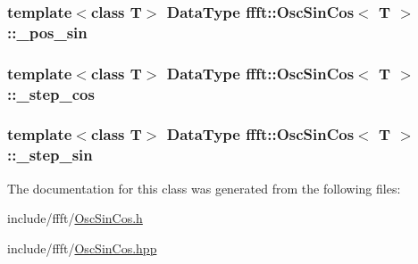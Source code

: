 \subsubsection[{\texorpdfstring{\+\_\+pos\+\_\+sin}{_pos_sin}}]{\setlength{\rightskip}{0pt plus 5cm}template$<$class T$>$ {\bf Data\+Type} {\bf ffft\+::\+Osc\+Sin\+Cos}$<$ T $>$\+::\+\_\+pos\+\_\+sin\hspace{0.3cm}{\ttfamily [private]}}\hypertarget{classffft_1_1OscSinCos_afddb969706b1b473229bf433d308b670}{}\label{classffft_1_1OscSinCos_afddb969706b1b473229bf433d308b670}
\subsubsection[{\texorpdfstring{\+\_\+step\+\_\+cos}{_step_cos}}]{\setlength{\rightskip}{0pt plus 5cm}template$<$class T$>$ {\bf Data\+Type} {\bf ffft\+::\+Osc\+Sin\+Cos}$<$ T $>$\+::\+\_\+step\+\_\+cos\hspace{0.3cm}{\ttfamily [private]}}\hypertarget{classffft_1_1OscSinCos_ad0bdc750147d730559311933ac124ab2}{}\label{classffft_1_1OscSinCos_ad0bdc750147d730559311933ac124ab2}
\subsubsection[{\texorpdfstring{\+\_\+step\+\_\+sin}{_step_sin}}]{\setlength{\rightskip}{0pt plus 5cm}template$<$class T$>$ {\bf Data\+Type} {\bf ffft\+::\+Osc\+Sin\+Cos}$<$ T $>$\+::\+\_\+step\+\_\+sin\hspace{0.3cm}{\ttfamily [private]}}\hypertarget{classffft_1_1OscSinCos_a1a55c352898b66ee77bff85e116fdce0}{}\label{classffft_1_1OscSinCos_a1a55c352898b66ee77bff85e116fdce0}


The documentation for this class was generated from the following files\+:\begin{DoxyCompactItemize}
\item 
include/ffft/\hyperlink{OscSinCos_8h}{Osc\+Sin\+Cos.\+h}\item 
include/ffft/\hyperlink{OscSinCos_8hpp}{Osc\+Sin\+Cos.\+hpp}\end{DoxyCompactItemize}
